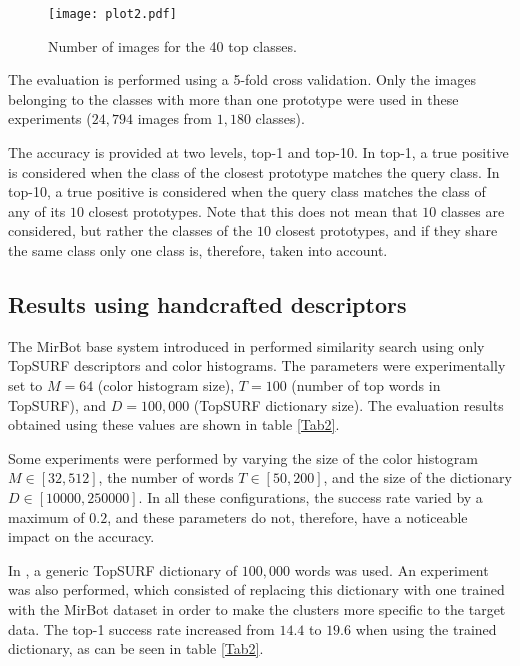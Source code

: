 \documentclass[final, twocolumn]{elsarticle}
\begin{document}
\begin{figure}[ht]
\center
\texttt{[image: plot2.pdf]}
\caption{\label{Plot2}Number of images for the 40 top classes. }
\end{figure}

The evaluation is performed using a 5-fold cross validation. Only the images belonging to the classes with more than one prototype were used in these experiments ($24,794$ images from $1,180$ classes).

The accuracy is provided at two levels, top-1 and top-10. In top-1, a true positive is considered when the class of the closest prototype matches the query class. In top-10, a true positive is considered when the query class matches the class of any of its $10$ closest prototypes. Note that this does not mean that $10$ classes are considered, but rather the classes of the $10$ closest prototypes, and if they share the same class only one class is, therefore, taken into account.


\subsection{Results using handcrafted descriptors}

The MirBot base system introduced in \cite{MirBot:System} performed similarity search using only TopSURF descriptors and color histograms. The parameters were experimentally set to $M=64$ (color histogram size), $T=100$ (number of top words in TopSURF), and $D=100,000$ (TopSURF dictionary size). The evaluation results obtained using these values are shown in table \ref{Tab2}.

Some experiments were performed by varying the size of the color histogram $M \in [32,512]$, the number of words $T\in [50,200]$, and the size of the dictionary $D\in [10000, 250000]$. In all these configurations, the success rate varied by a maximum of $0.2$, and these parameters do not, therefore, have a noticeable impact on the accuracy.

In \cite{MirBot:System}, a generic TopSURF dictionary of $100,000$ words was used. An experiment was also performed, which consisted of replacing this dictionary with one trained with the MirBot dataset in order to make the clusters more specific to the target data. The top-1 success rate increased from $14.4$ to $19.6$ when using the trained dictionary, as can be seen in table \ref{Tab2}.
\end{document}

